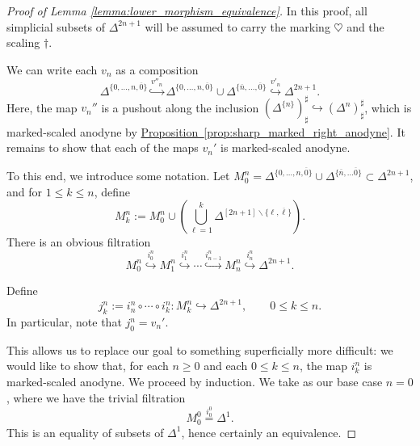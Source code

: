 \documentclass[main.tex]{subfiles}
\begin{document}
\begin{proof}[Proof of Lemma \ref{lemma:lower_morphism_equivalence}]
  In this proof, all simplicial subsets of $\Delta^{2n+1}$ will be assumed to carry the marking $\heartsuit$ and the scaling $\dagger$.

  We can write each $v_{n}$ as a composition
  \begin{equation*}
    \Delta^{\{0, \ldots, n, \overline{0}\}} \overset{v''_{n}}{\hookrightarrow} \Delta^{\{0, \ldots, n, \overline{0}\}} \cup \Delta^{\{\overline{n}, \ldots, \overline{0}\}} \overset{v'_{n}}{\hookrightarrow} \Delta^{2n+1}.
  \end{equation*}
  Here, the map $v_{n}''$ is a pushout along the inclusion $(\Delta^{\{n\}})^{\sharp}_{\sharp} \hookrightarrow (\Delta^{n})^{\sharp}_{\sharp}$, which is marked-scaled anodyne by \hyperref[prop:sharp_marked_right_anodyne]{Proposition~\ref*{prop:sharp_marked_right_anodyne}}. It remains to show that each of the maps $v_{n}'$ is marked-scaled anodyne.

  To this end, we introduce some notation. Let $M^{n}_{0} = \Delta^{\{0, \ldots, n, \overline{0}\}} \cup \Delta^{\{\overline{n}, \ldots \overline{0}\}} \subset \Delta^{2n+1}$, and for $1 \leq k \leq n$, define
  \begin{equation*}
    M^{n}_{k} := M^{n}_{0} \cup \left(\bigcup_{\ell = 1}^{k} \Delta^{[2n+1] \smallsetminus \{\ell, \overline{\ell}\}}\right).
  \end{equation*}
  There is an obvious filtration
  \begin{equation}
    \label{eq:filtration_by_adding_sides}
    M^{n}_{0} \overset{i^{n}_{0}}{\hookrightarrow} M^{n}_{1} \overset{i^{n}_{1}}{\hookrightarrow} \cdots \overset{i^{n}_{n-1}}{\hookrightarrow} M^{n}_{n} \overset{i^{n}_{n}}{\hookrightarrow} \Delta^{2n+1}.
  \end{equation}

  Define
  \begin{equation*}
    j^{n}_{k} := i^{n}_{n} \circ \cdots \circ i^{n}_{k}\colon M^{n}_{k} \hookrightarrow \Delta^{2n+1},\qquad 0 \leq k \leq n.
  \end{equation*}
  In particular, note that $j^{n}_{0} = v_{n}'$.

  This allows us to replace our goal to something superficially more difficult: we would like to show that, for each $n \geq 0$ and each $0 \leq k \leq n$, the map $i^{n}_{k}$ is marked-scaled anodyne. We proceed by induction. We take as our base case $n=0$, where we have the trivial filtration
  \begin{equation*}
    M^{0}_{0} \overset{i^{0}_{0}}{=} \Delta^{1}.
  \end{equation*}
  This is an equality of subsets of $\Delta^{1}$, hence certainly an equivalence.


\end{proof}
\end{document}
